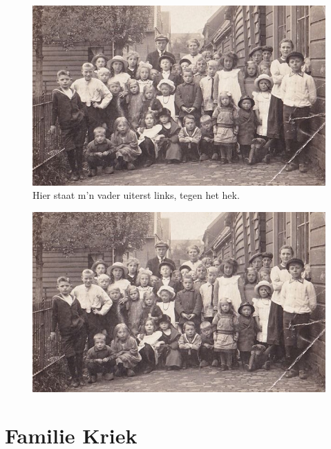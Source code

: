 \documentclass[12pt,twoside, openright]{memoir}
\begin{document}
\begin{figure}
\includegraphics[width=\textwidth]{img/ch2/ch2-afb13}
\caption*{\footnotesize Hier staat m’n vader uiterst links, tegen het hek.}
\end{figure}

\begin{figure}
\includegraphics[width=\textwidth]{img/ch2/ch2-afb13}
\caption*{\footnotesize }
\end{figure}




\chapter{Familie Kriek} %
\label{cha:familie_kriek}
\end{document}
